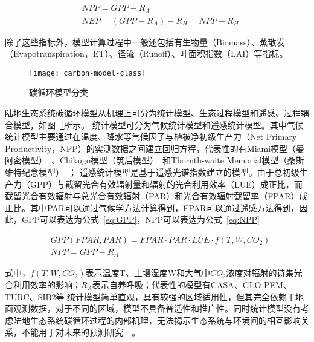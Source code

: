 \begin{align}
    & NPP = GPP-R_A
    \label{eq:NPP} \\
    & NEP = \left(GPP-R_A\right)-R_H = NPP-R_H
    \label{eq:NEP}
\end{align}

除了这些指标外，模型计算过程中一般还包括有生物量（Biomass）、蒸散发（Evapotranspiration，ET）、径流（Runoff）、叶面积指数（LAI）等指标。

\begin{figure}[!htbp]
    \centering
    \texttt{[image: carbon-model-class]}
    \caption{碳循环模型分类}
    \label{fig:carbon-model-class}
\end{figure}

陆地生态系统碳循环模型从机理上可分为统计模型、生态过程模型和遥感、过程耦合模型，如图~\ref{fig:carbon-model-class}所示。
统计模型可分为气候统计模型和遥感统计模型。其中气候统计模型主要通过在温度、降水等气候因子与植被净初级生产力（Net Primary Productivity，NPP）的实测数据之间建立回归方程，代表性的有Miami模型（曼阿密模型）~\cite{lieth1975modeling}、Chikugo模型（筑后模型）~\cite{seino1985agroclimatic}和Thornth-waite Memorial模型（桑斯维特纪念模型）~\cite{hai2012change}；
遥感统计模型是基于遥感光谱指数建立的模型。由于总初级生产力（GPP）与截留光合有效辐射量和辐射的光合利用效率（LUE）成正比，而截留光合有效辐射与总光合有效辐射（PAR）和光合有效辐射截留率（FPAR）成正比。其中PAR可以通过气候学方法计算得到，FPAR可以通过遥感方法得到，因此，GPP可以表达为公式~\ref{eq:GPP}，NPP可以表达为公式~\ref{eq:NPP}

\begin{align}
    &GPP(FPAR, PAR) = FPAR \cdot PAR \cdot LUE \cdot f(T, W, CO_2)
    \label{eq:GPP}  \\
    &NPP = GPP - R_A
    \label{eq:NPP}
\end{align}

式中，$f(T, W, CO_2)$表示温度T、土壤湿度W和大气中$CO_2$浓度对辐射的诗集光合利用效率的影响；$R_A$表示自养呼吸；代表性的模型有CASA、GLO-PEM、TURC、SIB2等
统计模型简单直观，具有较强的区域适用性，但其完全依赖于地面观测数据，对于不同的区域，模型不具备普适性和推广性。同时统计模型没有考虑陆地生态系统碳循环过程的内部机理，无法揭示生态系统与环境间的相互影响关系，不能用于对未来的预测研究~\cite{袁文平2014陆地生态系统植被生产力遥感模型研究进展}~\cite{谢馨瑶2018大尺度森林碳循环过程模拟模型综述}。

